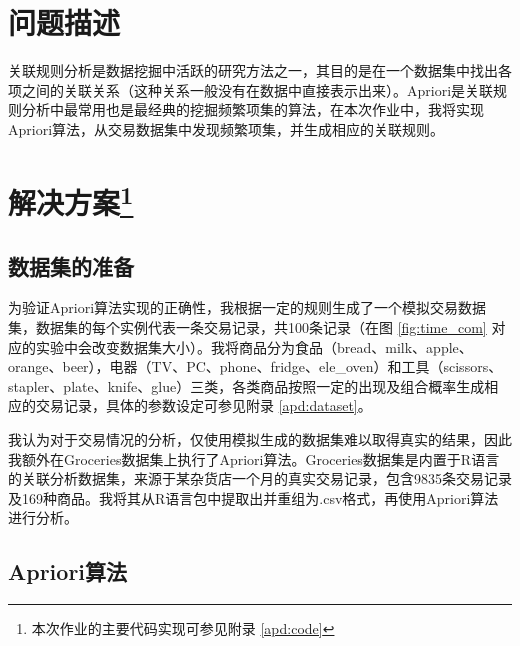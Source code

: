 \documentclass[12pt,a4paper]{article}
\theoremstyle{definition}
\begin{document}
\noindent
\noindent{}

\section{问题描述}

关联规则分析是数据挖掘中活跃的研究方法之一，其目的是在一个数据集中找出各项之间的关联关系（这种关系一般没有在数据中直接表示出来）。Apriori是关联规则分析中最常用也是最经典的挖掘频繁项集的算法，在本次作业中，我将实现Apriori算法，从交易数据集中发现频繁项集，并生成相应的关联规则。

\vspace{0.01\linewidth}
\section{解决方案\protect\footnote{本次作业的主要代码实现可参见附录 \ref{apd:code}}}

\vspace{0.006\linewidth}
\subsection{数据集的准备}

\vspace{0.006\linewidth}
为验证Apriori算法实现的正确性，我根据一定的规则生成了一个模拟交易数据集，数据集的每个实例代表一条交易记录，共100条记录（在图 \ref{fig:time_com} 对应的实验中会改变数据集大小）。我将商品分为食品（bread、milk、apple、orange、beer），电器（TV、PC、phone、fridge、ele\_oven）和工具（scissors、stapler、plate、knife、glue）三类，各类商品按照一定的出现及组合概率生成相应的交易记录，具体的参数设定可参见附录 \ref{apd:dataset}。

\vspace{0.015\linewidth}
我认为对于交易情况的分析，仅使用模拟生成的数据集难以取得真实的结果，因此我额外在Groceries数据集上执行了Apriori算法。Groceries数据集是内置于R语言的关联分析数据集，来源于某杂货店一个月的真实交易记录，包含9835条交易记录及169种商品。我将其从R语言包中提取出并重组为.csv格式，再使用Apriori算法进行分析。

\vspace{0.006\linewidth}
\subsection{Apriori算法}
\end{document}
